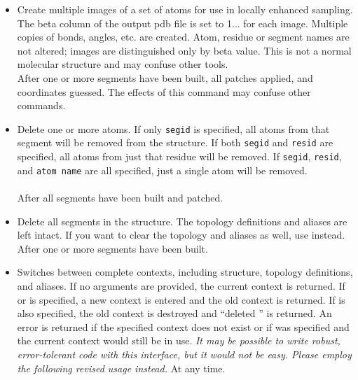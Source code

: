 \begin{itemize}
\item {}
{Create multiple images of a set of atoms for use in locally enhanced sampling.  The beta column of the output pdb file is set to 1... for each image.  Multiple copies of bonds, angles, etc. are created.  Atom, residue or segment names are not altered; images are distinguished only by beta value.  This is not a normal molecular structure and may confuse other tools.}
{\\
}
{After one or more segments have been built, all patches applied, and coordinates guessed.  The effects of this command may confuse other commands.}

\item {}
{Delete one or more atoms.  If only {\tt segid} is specified, all atoms from
that segment will be removed from the structure.  If both {\tt segid} and
{\tt resid} are specified, all atoms from just that residue will be removed.
If {\tt segid}, {\tt resid}, and {\tt atom name} are all specified, just a
single atom will be removed.}
{\\
\\
}
{After all segments have been built and patched.}

\item {}
{Delete all segments in the structure.  The topology definitions and 
aliases are left intact.  If you want to clear the topology and aliases
as well, use  instead.}
{}
{After one or more segments have been built.}

\item {}
{Switches between complete contexts, including structure, topology definitions,
and aliases.  If no arguments are provided, the current context is returned.
If  or  is specified, a new context is entered and
the old context is returned.  If  is also specified, the old
context is destroyed and ``deleted '' is returned.  An error
is returned if the specified context does not exist or if  was
specified and the current context would still be in use.
{\em It may be possible to write robust, error-tolerant code with this
interface, but it would not be easy.  Please employ the following revised
 usage instead.}}
{}
{At any time.}


\end{itemize}

